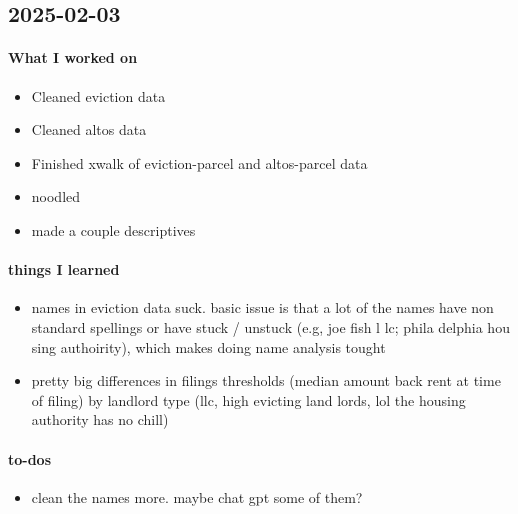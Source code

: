 \subsection{2025-02-03}

\paragraph{What I worked on}
\begin{itemize}
    \item Cleaned eviction data
    \item Cleaned altos data
    \item Finished xwalk of eviction-parcel and altos-parcel data
    \item noodled
    \item made a couple descriptives
\end{itemize}

\paragraph{things I learned}
\begin{itemize}
    \item names in eviction data suck. basic issue is that a lot of the names have non standard spellings or have stuck / unstuck (e.g, joe fish l lc; phila delphia hou sing authoirity), which makes doing name analysis tought
    \item pretty big differences in filings thresholds (median amount back rent at time of filing) by landlord type (llc, high evicting land lords, lol the housing authority has no chill)
\end{itemize}

\paragraph{to-dos}
\begin{itemize}
    \item clean the names more. maybe chat gpt some of them?
\end{itemize}